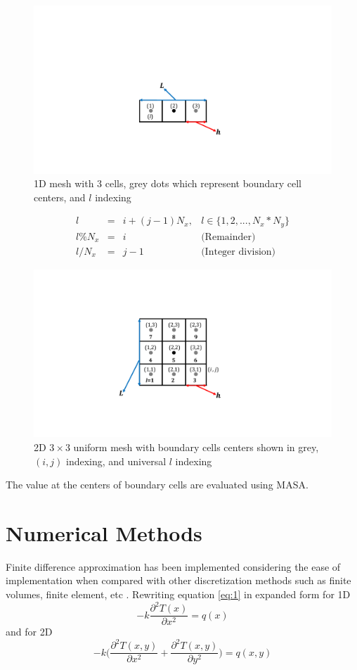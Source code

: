 \documentclass[12pt]{amsart}   %
\begin{document}
\begin{figure}[b!]
\hspace{1cm}
    \centering
    \includegraphics[width=0.5\linewidth]{HW4 figures-4.pdf}
    \caption{1D mesh with 3 cells, grey dots which represent boundary cell centers, and $l$ indexing}
    \label{fig:1}
\end{figure}


\begin{eqnarray}
l &=& i+(j-1)N_x, & \text{$l$}\in\{1,2,...,N_x*N_y\} \nonumber\\
l\%N_x &=& i & \text{(Remainder)}  \\
l/N_x &=& j-1 &\text{(Integer division)}  \nonumber 
\end{eqnarray}

\begin{figure}
    \centering
    \includegraphics[width=0.75\linewidth]{HW4 figures-3.pdf}
    \caption{2D $3\times3$ uniform mesh with boundary cells centers shown in grey, $(i,j)$ indexing, and universal $l$ indexing}
    \label{fig:2}
\end{figure}
The value at the centers of boundary cells are evaluated using MASA.

\section{Numerical Methods}
Finite difference approximation has been implemented considering the ease of implementation when compared with other discretization methods such as finite volumes, finite element, etc \cite{quarteroni2010numerical}. Rewriting equation \ref{eq:1} in expanded form for 1D
\begin{equation} \label{eq:5}
    -k \frac{\partial^2 T(x) }{\partial x^2} = q(x)
\end{equation}
and for 2D
\begin{equation}\label{eq:6new}
    -k \bigg(\frac{\partial^2 T(x,y) }{\partial x^2}+\frac{\partial^2 T(x,y) }{\partial y^2} \bigg) = q(x,y)
\end{equation}
\end{document}

